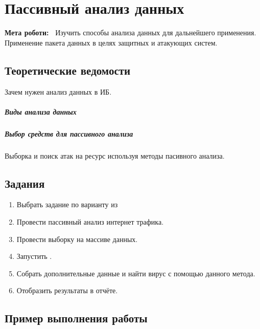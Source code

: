 \chapter{Пассивный анализ данных} \label{chapt8}%
\textbf{Мета роботи:~}%
Изучить способы анализа данных для дальнейшего применения. Применение пакета
данных в целях защитных и атакующих систем.
\section{Теоретические ведомости} \label{sect7_a}

Зачем нужен анализ данных в ИБ.

\paragraph{Виды анализа данных}

\paragraph{Выбор средств для пассивного анализа}

Выборка и поиск атак на ресурс используя методы пасивного анализа.




\section{Задания}\label{sect7_b}
%
\begin{enumerate}
  \item Выбрать задание по варианту из 
  \item Провести пассивный анализ интернет трафика.
  \item Провести выборку на массиве данных.
  \item Запустить .
  \item Собрать дополнительные данные и найти вирус с помощью данного
      метода.
  \item Отобразить результаты в отчёте.
\end{enumerate}
\section{Пример выполнения работы}\label{sect7_c}
%
